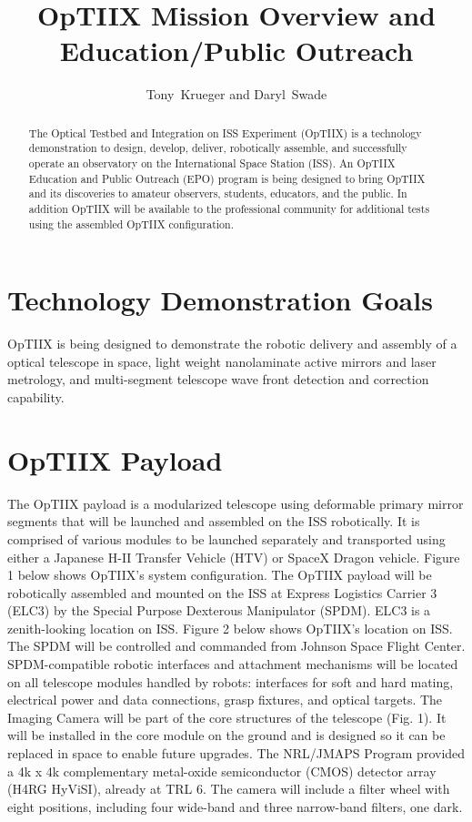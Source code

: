 
\resetcounters




\title{OpTIIX Mission Overview and Education/Public Outreach}
\author{Tony~Krueger and Daryl~Swade
}

\begin{abstract}
The Optical Testbed and Integration on ISS Experiment (OpTIIX) is a technology demonstration to design, develop, deliver, robotically assemble, and successfully operate an observatory on the International Space Station (ISS).  An OpTIIX Education and Public Outreach (EPO) program is being designed to bring OpTIIX and its discoveries to amateur observers, students, educators, and the public.  In addition OpTIIX will be available to the professional community for additional tests using the assembled OpTIIX configuration. 
\end{abstract}

\section{Technology Demonstration Goals}
OpTIIX is being designed to demonstrate the robotic delivery and assembly of a optical telescope in space, light weight nanolaminate active mirrors and laser metrology, and multi-segment telescope wave front detection and correction capability.

\section{OpTIIX Payload}
The OpTIIX payload is a modularized telescope using deformable primary mirror segments that will be launched and assembled on the ISS robotically.  It is comprised of various modules to be launched separately and transported using either a Japanese H-II Transfer Vehicle (HTV) or SpaceX Dragon vehicle.  Figure 1 below shows OpTIIX’s system configuration.  The OpTIIX payload will be robotically assembled and mounted on the ISS at Express Logistics Carrier 3 (ELC3) by the Special Purpose Dexterous Manipulator (SPDM).  ELC3 is a zenith-looking location on ISS.  Figure 2 below shows OpTIIX’s location on ISS. The SPDM will be controlled and commanded from Johnson Space Flight Center. SPDM-compatible robotic interfaces and attachment mechanisms will be located on all telescope modules handled by robots: interfaces for soft and hard mating, electrical power and data connections, grasp fixtures, and optical targets.  The Imaging Camera will be part of the core structures of the telescope (Fig. 1). It will be installed in the core module on the ground and is designed so it can be replaced in space to enable future upgrades. The NRL/JMAPS Program provided a 4k x 4k complementary metal-oxide semiconductor (CMOS) detector array (H4RG HyViSI), already at TRL 6. The camera will include a filter wheel with eight positions, including four wide-band and three narrow-band filters, one dark.

